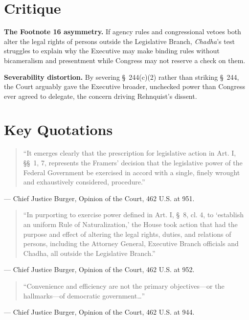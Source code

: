 \documentclass[12pt]{article}
\begin{document}
\section{Critique}

\textbf{The Footnote 16 asymmetry.} If agency rules and congressional vetoes both alter the legal rights of persons outside the Legislative Branch, \textit{Chadha}'s test struggles to explain why the Executive may make binding rules without bicameralism and presentment while Congress may not reserve a check on them.

\textbf{Severability distortion.} By severing \S~244(c)(2) rather than striking \S~244, the Court arguably gave the Executive broader, unchecked power than Congress ever agreed to delegate, the concern driving Rehnquist's dissent.

\section{Key Quotations}

\begin{quote}
``It emerges clearly that the prescription for legislative action in Art. I, \S\S~1, 7, represents the Framers' decision that the legislative power of the Federal Government be exercised in accord with a single, finely wrought and exhaustively considered, procedure.''
\end{quote}
\noindent --- Chief Justice Burger, Opinion of the Court, 462 U.S. at 951.

\begin{quote}
``In purporting to exercise power defined in Art. I, \S~8, cl. 4, to `establish an uniform Rule of Naturalization,' the House took action that had the purpose and effect of altering the legal rights, duties, and relations of persons, including the Attorney General, Executive Branch officials and Chadha, all outside the Legislative Branch.''
\end{quote}
\noindent --- Chief Justice Burger, Opinion of the Court, 462 U.S. at 952.

\begin{quote}
``Convenience and efficiency are not the primary objectives---or the hallmarks---of democratic government\ldots''
\end{quote}
\noindent --- Chief Justice Burger, Opinion of the Court, 462 U.S. at 944.
\end{document}
